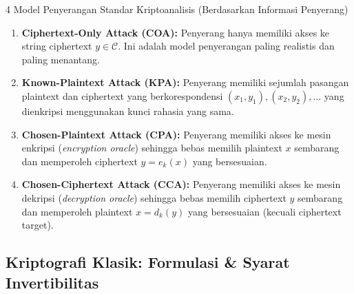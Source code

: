 \documentclass[11pt,a4paper]{article}
\begin{document}
\begin{teoribox}{4 Model Penyerangan Standar Kriptoanalisis (Berdasarkan Informasi Penyerang)}
\begin{enumerate}[leftmargin=*]
    \item \textbf{Ciphertext-Only Attack (COA):} Penyerang hanya memiliki akses ke string ciphertext $y \in \mathcal{C}$. Ini adalah model penyerangan paling realistis dan paling menantang.
    \item \textbf{Known-Plaintext Attack (KPA):} Penyerang memiliki sejumlah pasangan plaintext dan ciphertext yang berkorespondensi $(x_1, y_1), (x_2, y_2), \dots$ yang dienkripsi menggunakan kunci rahasia yang sama.
    \item \textbf{Chosen-Plaintext Attack (CPA):} Penyerang memiliki akses ke mesin enkripsi (\textit{encryption oracle}) sehingga bebas memilih plaintext $x$ sembarang dan memperoleh ciphertext $y = e_k(x)$ yang bersesuaian.
    \item \textbf{Chosen-Ciphertext Attack (CCA):} Penyerang memiliki akses ke mesin dekripsi (\textit{decryption oracle}) sehingga bebas memilih ciphertext $y$ sembarang dan memperoleh plaintext $x = d_k(y)$ yang bersesuaian (kecuali ciphertext target).
\end{enumerate}
\end{teoribox}

\subsection{Kriptografi Klasik: Formulasi \& Syarat Invertibilitas}
\end{document}
